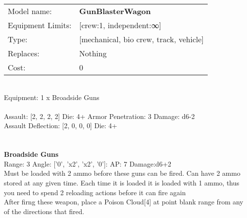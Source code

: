 \noindent
\begin{tabular}{ll}
Model name: &{\bf GunBlasterWagon } \\
Equipment Limits: &[crew:1, independent:∞] \\
Type: &[mechanical, bio crew, track, vehicle] \\
Replaces: &Nothing \\
Cost: & 0\\
\end{tabular}
\ \\
Equipment: 1 x Broadside Guns \\
\ \\
Assault: [2, 2, 2, 2] Die: 4+ Armor Penetration: 3 Damage: d6-2 \\
Assault Deflection: [2, 0, 0, 0] Die: 4+\\
\indent  
\ \\

\ \\
{\bf Broadside Guns } \\



Range: 3  Angle: ['0', 'x2', 'x2', '0']: AP: 7 Damage:d6+2 \\
Must be loaded with 2 ammo before these guns can be fired. Can have 2 ammo stored at any given time. Each time it is loaded it is loaded with 1 ammo, thus you need to spend 2 reloading actions before it can fire again\\ 
After firng these weapon, place a Poison Cloud[4] at point blank range from any of the directions that fired.\\ 




 
\ \\



